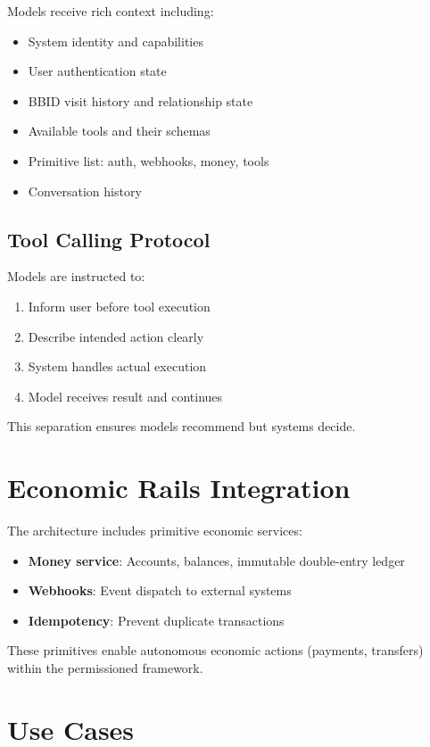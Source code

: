 \documentclass[11pt,a4paper]{article}
\begin{document}
Models receive rich context including:
\begin{itemize}
    \item System identity and capabilities
    \item User authentication state
    \item BBID visit history and relationship state
    \item Available tools and their schemas
    \item Primitive list: auth, webhooks, money, tools
    \item Conversation history
\end{itemize}

\subsection{Tool Calling Protocol}

Models are instructed to:
\begin{enumerate}
    \item Inform user before tool execution
    \item Describe intended action clearly
    \item System handles actual execution
    \item Model receives result and continues
\end{enumerate}

This separation ensures models recommend but systems decide.

\section{Economic Rails Integration}

The architecture includes primitive economic services:
\begin{itemize}
    \item \textbf{Money service}: Accounts, balances, immutable double-entry ledger
    \item \textbf{Webhooks}: Event dispatch to external systems
    \item \textbf{Idempotency}: Prevent duplicate transactions
\end{itemize}

These primitives enable autonomous economic actions (payments, transfers) within the permissioned framework.

\section{Use Cases}
\end{document}
